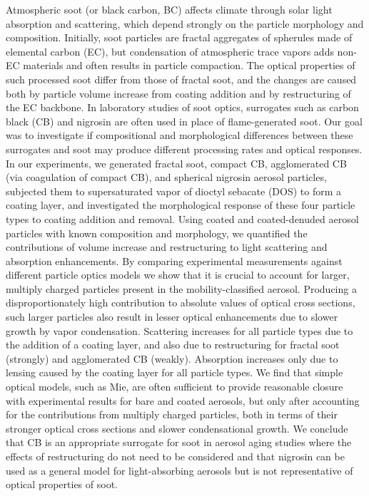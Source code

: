 Atmospheric soot (or black carbon, BC) affects climate through solar light absorption and scattering, which depend strongly on the particle morphology and composition. Initially, soot particles are fractal aggregates of spherules made of  elemental carbon (EC), but condensation of atmospheric trace vapors adds non-EC materials and often results in particle compaction. The optical properties of such processed soot differ from those of fractal soot, and the changes are caused both by particle volume increase from coating addition and by restructuring of the EC backbone. In laboratory studies of soot optics, surrogates such as carbon black (CB) and nigrosin are often used in place of flame-generated soot. Our goal was to investigate if compositional and morphological differences between these surrogates and soot may produce different processing rates and optical responses. In our experiments, we generated fractal soot, compact CB, agglomerated CB (via coagulation of compact CB), and spherical nigrosin aerosol particles, subjected them to supersaturated vapor of dioctyl sebacate (DOS) to form a coating layer, and investigated the morphological response of these four particle types to coating addition and removal. Using coated and coated-denuded aerosol particles with known composition and morphology, we quantified the contributions of volume increase and restructuring to light scattering and absorption enhancements. By comparing experimental measurements against different particle optics models we show that it is crucial to account for larger, multiply charged particles present in the mobility-classified aerosol. Producing a disproportionately high contribution to absolute values of optical cross sections, such larger particles also result in lesser optical enhancements due to slower growth by vapor condensation. Scattering increases for all particle types due to the addition of a coating layer, and also due to restructuring for fractal soot (strongly) and agglomerated CB (weakly). Absorption increases only due to lensing caused by the coating layer for all particle types. We find that simple optical models, such as Mie, are often sufficient to provide reasonable closure with experimental results for bare and coated aerosols, but only after accounting for the contributions from multiply charged particles, both in terms of their stronger optical cross sections and slower condensational growth. We conclude that CB is an appropriate surrogate for soot in aerosol aging studies where the effects of restructuring do not need to be considered and that nigrosin can be used as a general model for light-absorbing aerosols but is not representative of optical properties of soot.